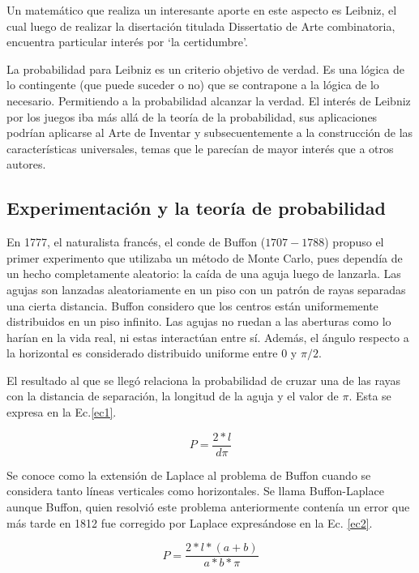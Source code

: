 \documentclass{rbf}
\begin{document}
Un matemático que realiza un interesante aporte en este aspecto es Leibniz, el cual luego de realizar la disertación titulada Dissertatio de Arte combinatoria, encuentra particular interés por ‘la certidumbre’.

La probabilidad para Leibniz es un criterio objetivo de verdad. Es una lógica de lo contingente (que puede suceder o no) que se contrapone a la lógica de lo necesario. Permitiendo a la probabilidad alcanzar la verdad. El interés de Leibniz por los juegos iba más allá de la teoría de la probabilidad, sus aplicaciones podrían aplicarse al Arte de Inventar y subsecuentemente a la construcción de las características universales, temas que le parecían de mayor interés que a otros autores.\cite{charles}

\subsection{Experimentación y la teoría de probabilidad}

En 1777, el naturalista francés, el conde de Buffon ($1707-1788$) propuso el primer experimento que utilizaba un método de Monte Carlo, pues dependía de un hecho completamente aleatorio: la caída de una aguja luego de lanzarla. Las agujas son lanzadas aleatoriamente en un piso con un patrón de rayas separadas una cierta distancia. Buffon considero que los centros están uniformemente distribuidos en un piso infinito. Las agujas no ruedan a las aberturas como lo harían en la vida real, ni estas interactúan entre sí. Además, el ángulo respecto a la horizontal es considerado distribuido uniforme entre 0 y $\pi/2$.

El resultado al que se llegó relaciona la probabilidad de cruzar una de las rayas con la distancia de separación, la longitud de la aguja y el valor de $\pi$. Esta se expresa en la Ec.\ref{ec1}.

\begin{equation}\label{ec1}
    P=\frac{2*l}{d\pi}
\end{equation}

Se conoce como la extensión de Laplace al problema de Buffon cuando se considera tanto líneas verticales como horizontales. Se llama Buffon-Laplace aunque Buffon, quien resolvió este problema anteriormente contenía un error que más tarde en 1812 fue corregido por Laplace expresándose en la Ec. \ref{ec2}.

\begin{equation}\label{ec2}
    P=\frac{2*l*(a+b)}{a*b*\pi}
\end{equation}
\end{document}

